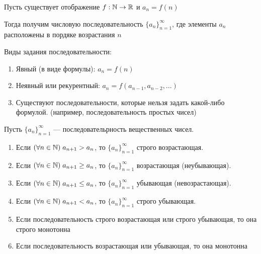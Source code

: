 \documentclass{article}
\begin{document}
Пусть существует отображение $f:\mathbb{N}\to\mathbb{R}$ и $a_{n}=f(n)$

Тогда получим числовую последовательность $\{a_{n}\}_{n=1}^{\infty}$, где элементы $a_{n}$ расположены в пордяке возрастания $n$

Виды задания последовательности:
\begin{enumerate}
	\item{}Явный (в виде формулы): $a_n=f(n)$
	\item{}Неявный или рекурентный: $a_n=f(a_{n-1}, a_{n-2}, ...)$
	\item{}Существуют последовательности, которые нельзя задать какой-либо формулой. (например, последовательность простых чисел)
\end{enumerate}

\pagebreak


Пусть $\{a_n\}^{\infty}_{n=1}$ --- последовательрность вещественных чисел.
\begin{enumerate}
	\item{} Если $(\forall n\in\mathbb{N})\;a_{n+1}>a_{n}$, то  $\{a_n\}^{\infty}_{n=1}$ строго возрастающая.
	\item{} Если $(\forall n\in\mathbb{N})\;a_{n+1} \geq a_{n}$, то  $\{a_n\}^{\infty}_{n=1}$ возрастающая (неубывающая).
	\item{} Если $(\forall n\in\mathbb{N})\;a_{n+1} \leq a_{n}$, то  $\{a_n\}^{\infty}_{n=1}$ убывающая (невозрастающая).
	\item{} Если $(\forall n\in\mathbb{N})\;a_{n+1}<a_{n}$, то  $\{a_n\}^{\infty}_{n=1}$ строго убывающая.
	\item{} Если последовательность строго возрастающая или строго убывающая, то она строго монотонна
	\item{} Если последовательность возрастающая или убывающая, то она монотонна
\end{enumerate}
\end{document}
